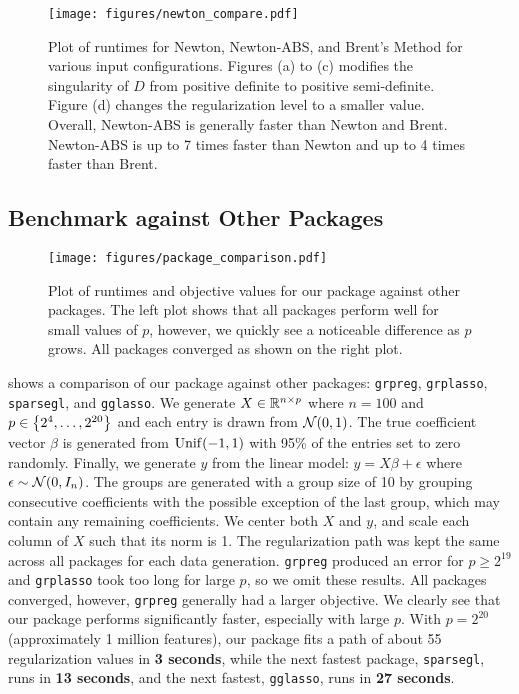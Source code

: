 \begin{figure}[t]
    \centering 
    \texttt{[image: figures/newton\_compare.pdf]}
    \caption{Plot of runtimes for Newton, Newton-ABS, and Brent's Method
    for various input configurations.
    Figures (a) to (c) modifies the singularity of $D$ from positive definite to positive semi-definite.
    Figure (d) changes the regularization level to a smaller value.
    Overall, Newton-ABS is generally faster than Newton and Brent.
    Newton-ABS is up to 7 times faster than Newton and up to 4 times faster than Brent.
    }
    \label{fig:bench:newton-compare}
\end{figure}

\subsection{Benchmark against Other Packages}\label{ssec:benchmark:packages}

\begin{figure}[t]
    \centering 
    \texttt{[image: figures/package\_comparison.pdf]}
    \caption{Plot of runtimes and objective values for our package against other packages.
    The left plot shows that all packages perform well for small values of $p$,
    however, we quickly see a noticeable difference as $p$ grows.
    All packages converged as shown on the right plot.
    }
    \label{fig:bench:packages}
\end{figure}

 shows a comparison of our package
against other packages: \texttt{grpreg}, \texttt{grplasso}, \texttt{sparsegl}, and \texttt{gglasso}.
We generate $X \in \mathbb{R}^{n \times p}$ where $n = 100$ and $p \in \left\{2^4, \ldots, 2^{20}\right\}$
and each entry is drawn from $\mathcal{N}(0,1)$.
The true coefficient vector $\beta$ is generated from $\operatorname{Unif}(-1,1)$ with 95\% of the entries
set to zero randomly.
Finally, we generate $y$ from the linear model: $y = X \beta + \epsilon$ where $\epsilon \sim \mathcal{N}(0, I_n)$.
The groups are generated with a group size of 10 
by grouping consecutive coefficients with the possible exception
of the last group, which may contain any remaining coefficients.
We center both $X$ and $y$, and scale each column of $X$ such that its norm is 1.
The regularization path was kept the same across all packages for each data generation.
\texttt{grpreg} produced an error for $p \geq 2^{19}$
and \texttt{grplasso} took too long for large $p$, so we omit these results.
All packages converged, however, \texttt{grpreg} generally had a larger objective.
We clearly see that our package
performs significantly faster, especially with large $p$.
With $p = 2^{20}$ (approximately 1 million features), our package
fits a path of about 55 regularization values in \textbf{3 seconds},
while the next fastest package, \texttt{sparsegl}, runs in \textbf{13 seconds},
and the next fastest, \texttt{gglasso}, runs in \textbf{27 seconds}.

